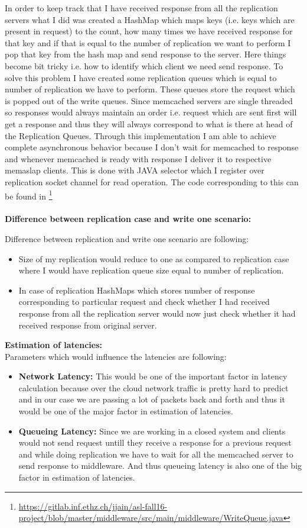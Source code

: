\documentclass[11pt]{article}
\begin{document}
In order to keep track that I have received response from all the replication servers what I did was created a HashMap which maps keys (i.e. keys which are present in request) to the count, how many times we have received response for that key and if that is equal to the number of replication we want to perform I pop that key from the hash map and send response to the server. Here things become bit tricky i.e. how to identify which client we need send response. To solve this problem I have created some replication queues which is equal to number of replication we have to perform. These queues store the request which is popped out of the write queues. Since memcached servers are single threaded so responses would always maintain an order i.e. request which are sent first will get a response and thus they will always correspond to what is there at head of the Replication Queues. Through this implementation I am able to achieve complete asynchronous behavior because I don't wait for memcached to response and whenever memcached is ready with response I deliver it to respective memaslap clients. This is done with JAVA selector which I register over replication socket channel for read operation. The code corresponding to this can be found in \footnote{\url{https://gitlab.inf.ethz.ch/jjain/asl-fall16-project/blob/master/middleware/src/main/middleware/WriteQueue.java}}
\\ \\
\textbf{Difference between replication case and write one scenario:}

Difference between replication and write one scenario are following:
\begin{itemize}
	\item Size of my replication would reduce to one as compared to replication case where I would have replication queue size equal to number of replication.
	\item In case of replication HashMaps which stores number of response corresponding to particular request and check whether I had received response from all the replication server would now just check whether it had received response from original server.
\end{itemize}
\textbf{Estimation of latencies:}
\\
Parameters which would influence the latencies are following:
\begin{itemize}
	\item \textbf{Network Latency:} This would be one of the important factor in latency calculation because over the cloud network traffic is pretty hard to predict and in our case we are passing a lot of packets back and forth and thus it would be one of the major factor in estimation of latencies.
	\item \textbf{Queueing Latency:} Since we are working in a closed system and clients would not send request untill they receive a response for a previous request and while doing replication we have to wait for all the memcached server to send response to middleware. And thus queueing latency is also one of the big factor in estimation of latencies.
\end{itemize}
\end{document}
